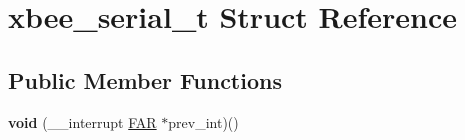 \hypertarget{structxbee__serial__t}{\section{xbee\-\_\-serial\-\_\-t Struct Reference}
\label{structxbee__serial__t}
}
\subsection*{Public Member Functions}
\begin{DoxyCompactItemize}
\item 
\hypertarget{group__hal__dos_ga475b2e273ce4aad9558201d41b6f4459}{{\bfseries void} (\-\_\-\-\_\-interrupt \hyperlink{group__hal_gaef060b3456fdcc093a7210a762d5f2ed}{F\-A\-R} $\ast$prev\-\_\-int)()}\label{group__hal__dos_ga475b2e273ce4aad9558201d41b6f4459}

\end{DoxyCompactItemize}
